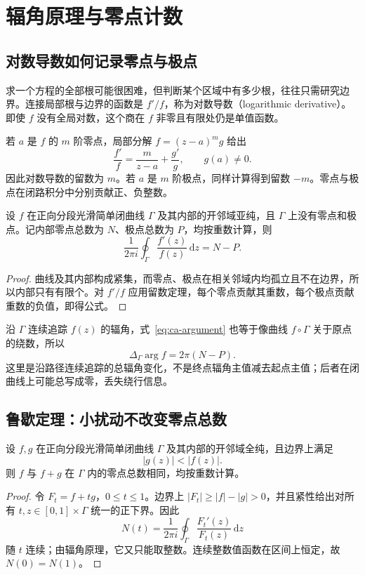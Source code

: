 \setcounter{chapter}{9} %
\chapter{辐角原理与零点计数}
\label{chap:ca-counting}

\section{对数导数如何记录零点与极点}

求一个方程的全部根可能很困难，但判断某个区域中有多少根，往往只需研究边界。连接局部根与边界的函数是 $f'/f$，称为对数导数（logarithmic derivative）。即使 $f$ 没有全局对数，这个商在 $f$ 非零且有限处仍是单值函数。

若 $a$ 是 $f$ 的 $m$ 阶零点，局部分解 $f=(z-a)^mg$ 给出
\[
 \frac{f'}f=\frac m{z-a}+\frac{g'}g,
 \qquad g(a)\ne0.
\]
因此对数导数的留数为 $m$。若 $a$ 是 $m$ 阶极点，同样计算得到留数 $-m$。零点与极点在闭路积分中分别贡献正、负整数。

\begin{theorem}[辐角原理]
\label{thm:ca-argument}
设 $f$ 在正向分段光滑简单闭曲线 $\Gamma$ 及其内部的开邻域亚纯，且 $\Gamma$ 上没有零点和极点。记内部零点总数为 $N$、极点总数为 $P$，均按重数计算，则
\begin{equation}
 \frac1{2\pi i}\oint_\Gamma\frac{f'(z)}{f(z)}\,\mathrm dz=N-P.
 \label{eq:ca-argument}
\end{equation}
\end{theorem}
\begin{proof}
曲线及其内部构成紧集，而零点、极点在相关邻域内均孤立且不在边界，所以内部只有有限个。对 $f'/f$ 应用留数定理，每个零点贡献其重数，每个极点贡献重数的负值，即得公式。
\end{proof}

沿 $\Gamma$ 连续追踪 $f(z)$ 的辐角，式~\eqref{eq:ca-argument} 也等于像曲线 $f\circ\Gamma$ 关于原点的绕数，所以
\[
 \Delta_\Gamma\arg f=2\pi(N-P).
\]
这里是沿路径连续追踪的总辐角变化，不是终点辐角主值减去起点主值；后者在闭曲线上可能总写成零，丢失绕行信息。

\section{鲁歇定理：小扰动不改变零点总数}

\begin{theorem}[鲁歇定理]
\label{thm:ca-rouche}
设 $f,g$ 在正向分段光滑简单闭曲线 $\Gamma$ 及其内部的开邻域全纯，且边界上满足
\[
 |g(z)|<|f(z)|.
\]
则 $f$ 与 $f+g$ 在 $\Gamma$ 内的零点总数相同，均按重数计算。
\end{theorem}
\begin{proof}
令 $F_t=f+tg$，$0\le t\le1$。边界上 $|F_t|\ge|f|-|g|>0$，并且紧性给出对所有 $t,z\in[0,1]\times\Gamma$ 统一的正下界。因此
\[
 N(t)=\frac1{2\pi i}\oint_\Gamma\frac{F_t'(z)}{F_t(z)}\,\mathrm dz
\]
随 $t$ 连续；由辐角原理，它又只能取整数。连续整数值函数在区间上恒定，故 $N(0)=N(1)$。
\end{proof}

